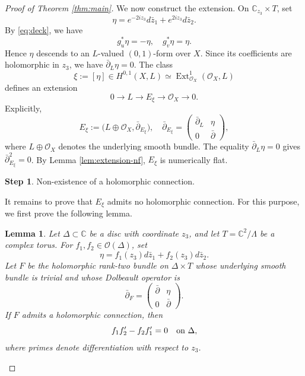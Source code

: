 \documentclass[11pt]{amsart}
\newcommand{\bp}{\bar{\partial}}
\newcommand{\C}{\mathbb C}
\newcommand{\OO}{\mathcal O}
\numberwithin{equation}{section}
\newtheorem{lemma}  [theorem]     {Lemma}
\theoremstyle{definition}
\theoremstyle{plain}
\theoremstyle{plain}
\theoremstyle{definition}
\theoremstyle{stepstyle}
\newtheorem{step}{Step}[section]
\begin{document}
\begin{proof}[{Proof of Theorem \ref{thm:main}}]
		We now construct the extension. On $\C_{z_3}\times T$, set
		\begin{equation}\label{eq:eta}
			\eta=e^{-2iz_3}d\bar z_1+e^{2iz_3}d\bar z_2.
		\end{equation}
		By \eqref{eq:deck}, we have
		$$
		g_u^*\eta=-\eta,\quad g_v^*\eta=\eta.
		$$
		Hence $\eta$ descends to an $L$-valued $(0,1)$-form over $X$.
		Since its coefficients are holomorphic in $z_3$, we have $\bp_L\eta=0$.
		The class
		$$
		\xi:=[\eta]\in H^{0,1}(X,L)
		\simeq\operatorname{Ext}^1_{\OO_X}(\OO_X,L)
		$$
		defines an extension
		\begin{equation*}\label{eq:bundle-extension}
			0\longrightarrow L\longrightarrow E_\xi\longrightarrow\OO_X\longrightarrow0.
		\end{equation*}
		Explicitly,
		\begin{equation}\label{eq:bundle}
			E_\xi:=\bigl(L\oplus\OO_X,\bp_{E_\xi}\bigr),\quad
			\bp_{E_\xi}=\begin{pmatrix}\bp_L&\eta\\0&\bp\end{pmatrix},
		\end{equation}
		where $L\oplus\OO_X$ denotes the underlying smooth bundle.
		The equality $\bp_L\eta=0$ gives $\bp_{E_\xi}^2=0$.
		By Lemma \ref{lem:extension-nf}, $E_\xi$ is numerically flat.
		
		\begin{step}
			Non-existence of a holomorphic connection.
		\end{step}
		It remains to prove that $E_\xi$ admits no holomorphic connection.
		For this purpose, we first prove the following lemma.
		
		\begin{lemma}\label{lem:obstruction}
			Let $\Delta\subset\C$ be a disc with coordinate $z_3$, and let
			$T=\C^2/\Lambda$ be a complex torus. For $f_1,f_2\in\OO(\Delta)$, set
			$$
			\eta=f_1(z_3)d\bar z_1+f_2(z_3)d\bar z_2.
			$$
			Let $F$ be the holomorphic rank-two bundle on $\Delta\times T$ whose underlying
			smooth bundle is trivial and whose Dolbeault operator is
			$$
			\bp_F=\begin{pmatrix}\bp&\eta\\0&\bp\end{pmatrix}.
			$$
			If $F$ admits a holomorphic connection, then
			\begin{equation*}\label{eq:obstruction}
				f_1f_2'-f_2f_1'=0\quad\hbox{on }\Delta,
			\end{equation*}
			where primes denote differentiation with respect to $z_3$.
		\end{lemma}
		

\end{proof}
\end{document}
